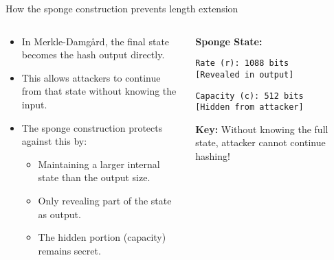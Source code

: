 \documentclass[aspectratio=169, lualatex, handout]{beamer}
\begin{document}
\begin{frame}{How the sponge construction prevents length extension}
	\begin{columns}[c]
		\begin{column}{0.55\textwidth}
			\begin{itemize}
				\item In Merkle-Damg\aa rd, the final state becomes the hash output directly.
				\item This allows attackers to continue from that state without knowing the input.
				\item The sponge construction protects against this by:
				      \begin{itemize}
					      \item Maintaining a larger internal state than the output size.
					      \item Only revealing part of the state as output.
					      \item The hidden portion (capacity) remains secret.
				      \end{itemize}
			\end{itemize}
		\end{column}
		\begin{column}{0.45\textwidth}
			\begin{tcolorbox}[colback=black!5!white,colframe=ciphergray]
				\textbf{Sponge State:}

				\vspace{0.2cm}

				\texttt{Rate (r): 1088 bits}\\
				\textcolor{cipheraccent}{\texttt{[Revealed in output]}}

				\vspace{0.2cm}

				\texttt{Capacity (c): 512 bits}\\
				\textcolor{cipherprimary}{\texttt{[Hidden from attacker]}}

				\vspace{0.3cm}

				\textcolor{cipherprimary}{\textbf{Key:} \small Without knowing the full state, attacker cannot continue hashing!}
			\end{tcolorbox}
		\end{column}
	\end{columns}
\end{frame}
\end{document}

